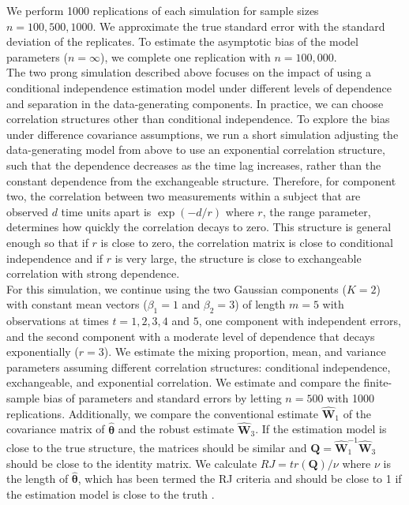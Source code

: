\documentclass[10pt]{article}
\newcommand{\B}[0]{\mathbf}
\newcommand{\bs}[0]{\boldsymbol}
\begin{document}
We perform 1000 replications of each simulation for sample sizes $n=100, 500, 1000$. We approximate the true standard error with the standard deviation of the replicates. To estimate the asymptotic bias of the model parameters ($n=\infty$), we complete one replication with $n=100,000$.\\

The two prong simulation described above focuses on the impact of using a conditional independence estimation model under different levels of dependence and separation in the data-generating components. In practice, we can choose correlation structures other than conditional independence. To explore the bias under difference covariance assumptions, we run a short simulation adjusting the data-generating model from above to use an exponential correlation structure, such that the dependence decreases as the time lag increases, rather than the constant dependence from the exchangeable structure. Therefore, for component two, the correlation between two measurements within a subject that are observed $d$ time units apart is $\exp(-d/r)$ where $r$, the range parameter, determines how quickly the correlation decays to zero. This structure is general enough so that if $r$ is close to zero, the correlation matrix is close to conditional independence and if $r$ is very large, the structure is close to exchangeable correlation with strong dependence. \\

For this simulation, we continue using the two Gaussian components ($K = 2$) with constant mean vectors ($\beta_{1}=1$ and $\beta_{2}=3$) of length $m=5$ with observations at times $t=1,2,3,4$ and $5$, one component with independent errors, and the second component with a moderate level of dependence that decays exponentially ($r=3$). We estimate the mixing proportion, mean, and variance parameters assuming different correlation structures: conditional independence, exchangeable, and exponential correlation. We estimate and compare the finite-sample bias of parameters and standard errors by letting $n=500$ with 1000 replications. Additionally, we compare the conventional estimate $\widehat{\B W}_{1}$ of the covariance matrix of $\widehat{\bs \theta}$ and the robust estimate $\widehat{\B W}_{3}$. If the estimation model is close to the true structure, the matrices should be similar and $\B Q = \widehat{\B W}_{1}^{-1}\widehat{\B W}_{3}$ should be close to the identity matrix. We calculate $RJ=tr(\B Q)/\nu$ where $\nu$ is the length of $\widehat{\bs\theta}$, which has been termed the RJ criteria and should be close to 1 if the estimation model is close to the truth \cite{shults2009,rotnitzky1990}.
\end{document}
